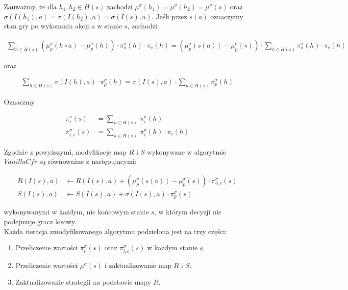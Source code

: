 \documentclass[licencjacka]{pracamgr}
\begin{document}
\noindent
Zauważmy, że dla $h_1, h_2 \in H(s)$ zachodzi $\mu^{\sigma}(h_1) = \mu^{\sigma}(h_2) = \mu^{\sigma}(s)$ oraz
$\sigma(I(h_1), a) = \sigma(I(h_2), a) = \sigma(I(s), a). $
Jeśli przez $s(a)$ oznaczymy stan gry po wykonaniu akcji $a$ w stanie $s$, zachodzi: 

\begin{align*}
\sum\limits_{h \in H(s)} (\mu_p^{\sigma}(h \circ a) - \mu_p^{\sigma}(h)) \cdot \pi_o^{\sigma}(h) \cdot \pi_c(h) =
(\mu_p^{\sigma}(s(a)) - \mu_p^{\sigma}(s)) \cdot \sum\limits_{h \in H(s)} \pi_o^{\sigma}(h) \cdot \pi_c(h)
\end{align*}

\noindent
oraz

\begin{align*}
\sum\limits_{h \in H(s)} \sigma(I(h), a) \cdot \pi_p^{\sigma}(h) =
\sigma(I(s), a) \cdot \sum\limits_{h \in H(s)} \pi_p^{\sigma}(h)
\end{align*}

\noindent
Oznaczmy

\begin{align*}
\pi_i^{\sigma}(s) &= \sum\limits_{h \in H(s)} \, \pi_i^{\sigma}(h) \\
\pi_{i,c}^{\sigma}(s) &= \sum\limits_{h \in H(s)} \, \pi_i^{\sigma}(h) \cdot \pi_c(h)
\end{align*}

\noindent
Zgodnie z powyższymi, modyfikacje map $R$ i $S$ wykonywane w algorytmie $VanillaCfr$ są
równoważne z następującymi:

\begin{align*}
R(I(s), a) &\leftarrow R(I(s), a) + (\mu_p^{\sigma}(s(a)) - \mu_p^{\sigma}(s)) \cdot \pi_{o,c}^{\sigma}(s) \\
S(I(s), a) &\leftarrow S(I(s), a) + \sigma(I(s), a) \cdot \pi_p^{\sigma}(s)
\end{align*}

\noindent
wykonywanymi w każdym, nie końcowym stanie $s$, w którym decyzji nie podejmuje gracz losowy. \\

\noindent
Każda iteracja zmodyfikowanego algorytmu podzielona jest na trzy części:
\begin{enumerate}
\item Przeliczenie wartości $\pi_i^{\sigma}(s)$ oraz $\pi_{i, c}^{\sigma}(s)$ w każdym stanie $s$.
\item Przeliczenie wartości $\mu^{\sigma}(s)$ i zaktualizowanie map $R$ i $S$.
\item Zaktualizowanie strategii na podstawie mapy $R$.
\end{enumerate}
\end{document}
